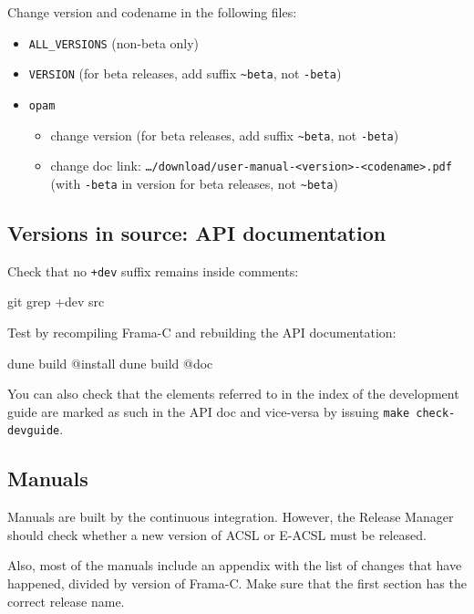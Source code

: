 Change version and codename in the following files:
\begin{itemize}
  \item \texttt{ALL\_VERSIONS} (non-beta only)
  \item \texttt{VERSION} (for beta releases, add suffix \texttt{\textasciitilde{}beta}, not \texttt{-beta})
  \item \texttt{opam}
  \begin{itemize}
     \item change version (for beta releases, add suffix \texttt{\textasciitilde{}beta}, not \texttt{-beta})
     \item change doc link: \texttt{…/download/user-manual-<version>-<codename>.pdf}
           (with \texttt{-beta} in version for beta releases, not \texttt{\textasciitilde{}beta})
  \end{itemize}
\end{itemize}

\subsection{Versions in source: API documentation}

Check that no \verb|+dev| suffix remains inside comments:

\begin{shell}
git grep +dev src
\end{shell}

Test by recompiling Frama-C and rebuilding the API documentation:
\begin{shell}
dune build @install
dune build @doc
\end{shell}

You can also check that the elements referred to in the index of the
development guide are marked as such in the API doc and vice-versa
by issuing \texttt{make check-devguide}.

\subsection{Manuals}

Manuals are built by the continuous integration. However, the Release Manager
should check whether a new version of ACSL or E-ACSL must be released.

Also, most of the manuals include an appendix with the list of changes that have
happened, divided by version of Frama-C. Make sure that the first section has
the correct release name.

